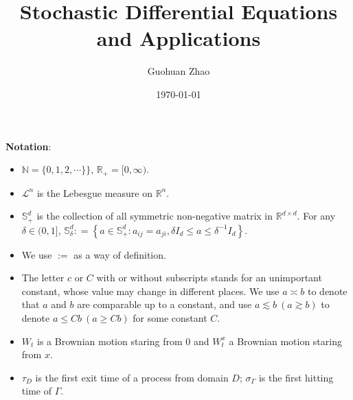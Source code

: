 \documentclass[twoside, 12pt]{book}
\numberwithin{equation}{chapter}
\def\mN{{\mathbb N}}
\def\mR{{\mathbb R}}
\def\mS{{\mathbb S}}
\def\sL{{\mathscr L}}
\def\l{\left}
\def\r{\right}
\def\geq{\geqslant}
\def\leq{\leqslant}
\begin{document}
	
	\title{Stochastic Differential Equations and Applications}
	
	\author{Guohuan Zhao}
	\date{\today}
	
	\maketitle
	\tableofcontents
	
	\newpage 
	
	{\bf Notation}: 
	\begin{itemize}
		\item $\mN=\{0,1,2,\cdots\}\}$, $\mR_+=[0,\infty)$. 
		\item $\sL^n$ is the Lebesgue measure on $\mR^n$. 
		\item $\mS^d_+$ is the collection of all symmetric non-negative matrix in $\mR^{d\times d}$. For any $\delta\in (0,1]$, $\mS_\delta^d : = \l\{a\in \mS^d_+: a_{ij}=a_{ji}, \delta I_d \leq a \leq \delta^{-1} I_d \r\}$. 
		\item We use $:=$ as a way of definition. 
		\item The letter $c$ or $C$ with or without subscripts stands for an unimportant constant, whose value may change in different places. We use $a \asymp b$ to denote that $a$ and $b$ are comparable up to a constant, and use $a\lesssim b~(a\gtrsim b)$ to denote $a\leq Cb~(a\geq Cb)$ for some constant $C$.
		\item $W_t$ is a Brownian motion staring from $0$ and $W_t^x$ a Brownian motion staring from $x$.
  \item $\tau_D$ is the first exit time of a process from domain $D$; $\sigma_\Gamma$ is the first hitting time of $\Gamma$.  
	\end{itemize}
	
\end{document}
